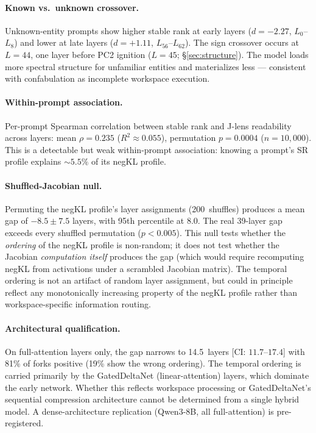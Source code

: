 \documentclass[11pt,a4paper]{article}
\begin{document}
\paragraph{Known vs.\ unknown crossover.} Unknown-entity prompts show
higher stable rank at early layers ($d{=}{-}2.27$, $L_0$--$L_8$) and
lower at late layers ($d{=}{+}1.11$, $L_{56}$--$L_{62}$). The sign
crossover occurs at $L{=}44$, one layer before PC2 ignition
($L{=}45$; \S\ref{sec:structure}). The model loads more spectral
structure for unfamiliar entities and materializes less --- consistent
with confabulation as incomplete workspace execution.

\paragraph{Within-prompt association.} Per-prompt Spearman correlation
between stable rank and J-lens readability across layers: mean
$\rho{=}0.235$ ($R^2 \approx 0.055$), permutation $p{=}0.0004$
($n{=}10{,}000$). This is a detectable but weak within-prompt
association: knowing a prompt's SR profile explains ${\sim}5.5\%$ of
its negKL profile.

\paragraph{Shuffled-Jacobian null.} Permuting the negKL profile's
layer assignments (200~shuffles) produces a mean gap of $-8.5 \pm 7.5$
layers, with 95th percentile at $8.0$. The real 39-layer gap exceeds
every shuffled permutation ($p < 0.005$). This null tests whether the
\emph{ordering} of the negKL profile is non-random; it does not test
whether the Jacobian \emph{computation itself} produces the gap
(which would require recomputing negKL from activations under a
scrambled Jacobian matrix). The temporal ordering is not an artifact
of random layer assignment, but could in principle reflect any
monotonically increasing property of the negKL profile rather than
workspace-specific information routing.

\paragraph{Architectural qualification.} On full-attention layers only,
the gap narrows to 14.5~layers [CI: $11.7$--$17.4$] with 81\% of
forks positive (19\% show the wrong ordering). The temporal ordering
is carried primarily by the GatedDeltaNet (linear-attention) layers,
which dominate the early network. Whether this reflects workspace
processing or GatedDeltaNet's sequential compression architecture
cannot be determined from a single hybrid model. A dense-architecture
replication (Qwen3-8B, all full-attention) is pre-registered.
\end{document}
